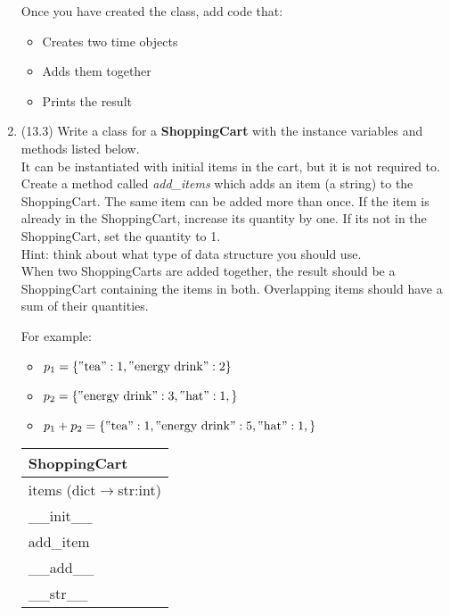 \documentclass{article}
\newcommand{\csqt}[1]{\text{\reflectbox{''}#1''}}  %
\begin{document}
\begin{enumerate}
		Once you have created the class, add code that:
		\begin{itemize}
			\item Creates two time objects
			\item Adds them together
			\item Prints the result
		\end{itemize}



\item (13.3)
		Write a class for a \textbf{ShoppingCart} with the instance variables and methods listed 
		below.\\
		It can be instantiated with initial items in the cart, but it is not required to.\\
		Create a method called \textit{add\_items} which adds an item (a string) to the 
		ShoppingCart. The same item can be added more than once. If the item is already in the 
		ShoppingCart, increase its quantity by one. If its not in the ShoppingCart, set the 
		quantity to 1.\\ Hint: think about what type of data structure you should use. \\
		When two ShoppingCarts are added together, the result should be a ShoppingCart 
		containing the items in both. Overlapping items should have a sum of their quantities.

		\begin{minipage}[t]{0.65\textwidth}
			For example:
			\begin{itemize}
				\item $p_1 = \{\csqt{tea}:1, \csqt{energy drink}:2 \}$
				\item $p_2 = \{\csqt{energy drink}:3, \csqt{hat}:1, \}$
				\item $p_1 + p_2 = \{\csqt{tea}:1, \csqt{energy drink}:5, \csqt{hat}:1, \}$
			\end{itemize}		
		\end{minipage}
		\hfill
		\begin{minipage}[t]{0.32\textwidth}
			\vspace{0.1em}
			\begin{flushright}
				\begin{tabular}{|l|} \hline
					ShoppingCart \\ \hline
					items (dict$\rightarrow$str:int) \\ \hline
					\_\_init\_\_ \\
					add\_item \\
					\_\_add\_\_ \\
					\_\_str\_\_ \\ \hline
				\end{tabular}
			\end{flushright}
		\end{minipage}
		

\end{enumerate}
\end{document}
